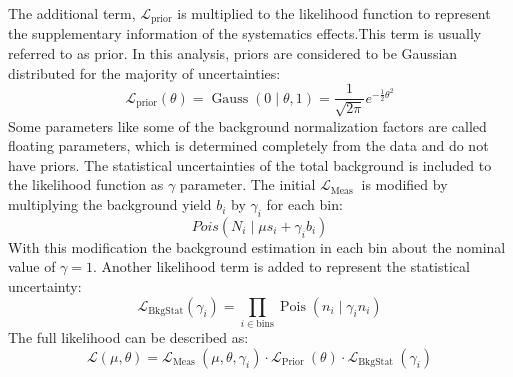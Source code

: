The additional term, $\mathcal{L}_{\text{prior}}$ is multiplied to the likelihood function to represent the supplementary information of the systematics effects.This term is usually referred to as prior. In this analysis, priors are considered to be Gaussian distributed for the majority of uncertainties:
\begin{equation}
\mathcal{L}_{\text {prior}}(\theta)=\operatorname{Gauss}(0 \mid \theta, 1)=\frac{1}{\sqrt{2 \pi}} e^{-\frac{1}{2} \theta^{2}}
\end{equation}
Some parameters like some of the background normalization factors are called floating parameters, which is determined completely from the data and do not have priors.
The statistical uncertainties of the total background is included to the likelihood function as $\gamma$ parameter. The initial $\mathcal{L}_{\text {Meas }}$ is modified by multiplying the background yield $b_i$ by $\gamma_i$ for each bin:
\begin{equation}
{Pois}\left(N_{i} \mid \mu s_{i}+\gamma_{i}b_{i}\right)
\end{equation}
With this modification the background estimation in each bin about the nominal value of $\gamma = 1$. Another likelihood term is added to represent the statistical uncertainty:
\begin{equation}
\mathcal{L}_{\mathrm{BkgStat}}\left(\gamma_{i}\right)=\prod_{i \in \mathrm{bins}} \operatorname{Pois}\left(n_{i} \mid \gamma_{i} n_{i}\right)
\end{equation}
The full likelihood can be described as:
\begin{equation}
\mathcal{L}(\mu, \theta)=\mathcal{L}_{\text {Meas }}\left(\mu, \theta, \gamma_{i}\right) \cdot \mathcal{L}_{\text {Prior }}(\theta) \cdot \mathcal{L}_{\text {BkgStat }}\left(\gamma_{i}\right)
\end{equation}


 


